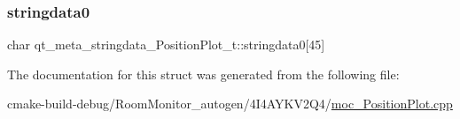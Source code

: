 \subsubsection{\texorpdfstring{stringdata0}{stringdata0}}
{\footnotesize\ttfamily char qt\+\_\+meta\+\_\+stringdata\+\_\+\+Position\+Plot\+\_\+t\+::stringdata0\mbox{[}45\mbox{]}}



The documentation for this struct was generated from the following file\+:\begin{DoxyCompactItemize}
\item 
cmake-\/build-\/debug/\+Room\+Monitor\+\_\+autogen/4\+I4\+A\+Y\+K\+V2\+Q4/\hyperlink{moc___position_plot_8cpp}{moc\+\_\+\+Position\+Plot.\+cpp}\end{DoxyCompactItemize}
